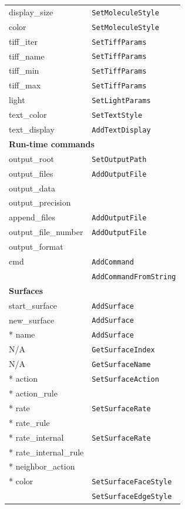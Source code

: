 \documentclass {book}
\newcommand {\ttt} {\texttt}
\begin{document}
\begin{longtable}[c]{ll}
display\_size & \ttt{SetMoleculeStyle}\\
color & \ttt{SetMoleculeStyle}\\
tiff\_iter & \ttt{SetTiffParams}\\
tiff\_name & \ttt{SetTiffParams}\\
tiff\_min & \ttt{SetTiffParams}\\
tiff\_max & \ttt{SetTiffParams}\\
light & \ttt{SetLightParams}\\
text\_color & \ttt{SetTextStyle}\\
text\_display & \ttt{AddTextDisplay}\\
\hline
\multicolumn{2}{l}{\hspace{0.3in}\textbf{Run-time commands}}\\
\hline
output\_root & \ttt{SetOutputPath}\\
output\_files & \ttt{AddOutputFile}\\
output\_data \\ %
output\_precision \\ %
append\_files & \ttt{AddOutputFile}\\
output\_file\_number & \ttt{AddOutputFile}\\
output\_format \\ %
cmd & \ttt{AddCommand}\\
& \ttt{AddCommandFromString}\\
\hline
\multicolumn{2}{l}{\hspace{0.3in}\textbf{Surfaces}}\\
\hline
start\_surface & \ttt{AddSurface}\\
new\_surface & \ttt{AddSurface}\\
{*} name & \ttt{AddSurface}\\
N/A & \ttt{GetSurfaceIndex}\\
N/A & \ttt{GetSurfaceName}\\
{*} action & \ttt{SetSurfaceAction}\\
{*} action\_rule \\ %
{*} rate & \ttt{SetSurfaceRate}\\
{*} rate\_rule \\ %
{*} rate\_internal & \ttt{SetSurfaceRate}\\
{*} rate\_internal\_rule \\ %
{*} neighbor\_action \\ %
{*} color & \ttt{SetSurfaceFaceStyle}\\
& \ttt{SetSurfaceEdgeStyle}\\

\end{longtable}
\end{document}
